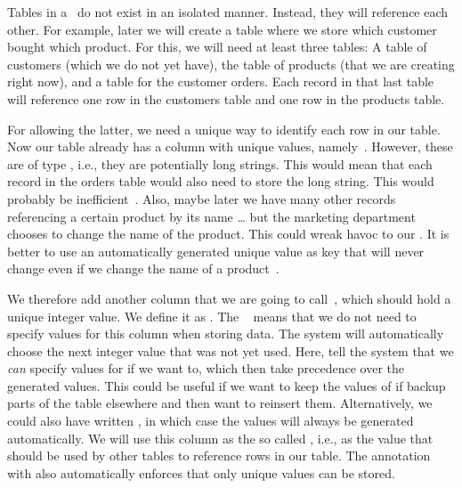 Tables in a \db\ do not exist in an isolated manner.
Instead, they will reference each other.
For example, later we will create a table where we store which customer bought which product.
For this, we will need at least three tables:
A table of customers (which we do not yet have), the table of products (that we are creating right now), and a table for the customer orders.
Each record in that last table will reference one row in the customers table and one row in the products table.

For allowing the latter, we need a unique way to identify each row in our table.
Now our table already has a column with unique values, namely~.
However, these are of type , i.e., they are potentially long strings.
This would mean that each record in the orders table would also need to store the long  string.
This would probably be inefficient~\cite{M2014VPKM}.
Also, maybe later we have many other records referencing a certain product by its name {\dots} but the marketing department chooses to change the name of the product.
This could wreak havoc to our \db.
It is better to use an automatically generated unique value as key that will never change even if we change the name of a product~\cite{B2025DS:SBPASG}.%
%
%
\begin{sloppypar}%
We therefore add another column that we are going to call~, which should hold a unique integer value.
We define it as .
The ~\cite{PGDG:PD:IC} means that we do not need to specify values for this column when storing data.
The system will automatically choose the next integer value that was not yet used.
Here,  tell the system that we \emph{can} specify values for  if we want to, which then take precedence over the generated values.
This could be useful if we want to keep the values of  if backup parts of the table elsewhere and then want to reinsert them.
Alternatively, we could also have written , in which case the  values will always be generated automatically.
We will use this column as the so called , i.e., as the value that should be used by other tables to reference rows in our  table.
The annotation with  also automatically enforces that only unique values can be stored.%
\end{sloppypar}%
